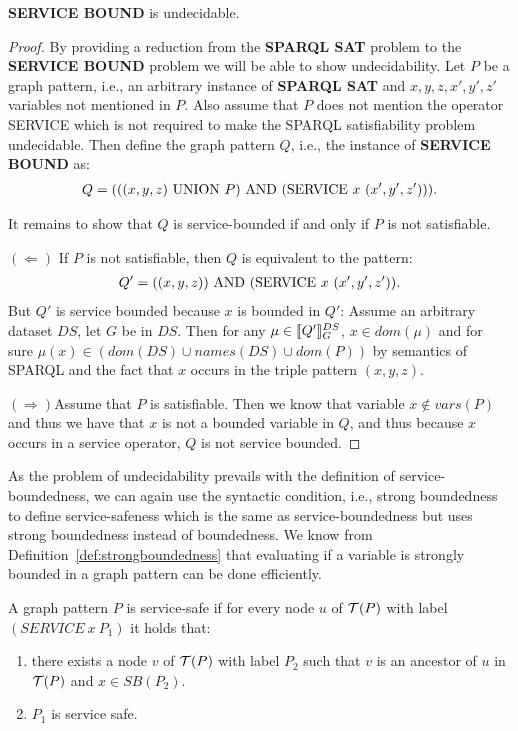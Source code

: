 \begin{theorem}
	\textbf{SERVICE BOUND} is undecidable.
\end{theorem}
\begin{proof}
	By providing a reduction from the \textbf{SPARQL SAT} problem to the  
	\textbf{SERVICE BOUND} problem we will be able to show undecidability.
	Let $P$ be a graph pattern, i.e., an arbitrary instance of \textbf{SPARQL SAT} and
	$x,y,z,x',y',z'$ variables not mentioned in $P$.
	Also assume that $P$ does not mention the operator SERVICE which is not required
	to make the SPARQL satisfiability problem undecidable.
	Then define the graph pattern $Q$, i.e., the instance of \textbf{SERVICE BOUND} as: 
	\begin{align*}
		Q = (((x,y,z) \mbox{ UNION }  P) \mbox{ AND } (\mbox{SERVICE } x \ (x', y', z'))).
	\end{align*}

	\noindent It remains to show that $Q$ is service-bounded if and only if $P$ is not
	satisfiable.

	\bigskip\noindent
	$(\Leftarrow)$ \quad If $P$ is not satisfiable, then $Q$ is equivalent to the
	pattern: 
	\begin{align*}
		Q' = ((x,y,z)) \mbox{ AND } (\mbox{SERVICE} \ x \ (x', y', z')).
	\end{align*} 
	But $Q'$ is service bounded because $x$ is bounded in $Q'$: Assume an
	arbitrary dataset $DS$, let $G$ be in $DS$. Then 
	for any $\mu \in \llbracket Q' \rrbracket^{DS}_G$, $x \in dom(\mu)$ and for sure $\mu(x) \in
	(dom(DS) \cup names(DS) \cup dom(P))$ by semantics of SPARQL and the fact that
	$x$ occurs in the triple pattern $(x,y,z)$.


	\bigskip\noindent
	$(\Rightarrow)$\quad Assume that $P$ is satisfiable. Then we know that variable
	$x \not\in vars(P)$ and thus we have that $x$ is not a bounded variable in $Q$,
	and thus because $x$ occurs in a service operator, $Q$ is not service
	bounded.
\end{proof}

As the problem of undecidability prevails with the definition of
service-boundedness, we can again use the syntactic condition, i.e., strong boundedness to define
service-safeness which is the same as service-boundedness but uses strong
boundedness instead of boundedness. We know from
Definition~\ref{def:strongboundedness} that evaluating if a variable is strongly
bounded in a graph pattern can be done efficiently.

\begin{definition}
	A graph pattern $P$ is service-safe if for every node $u$ of $\mathcal{T}(P)$ with
	label $(SERVICE \ x \ P_1)$ it holds that:
	\begin{enumerate}
		\item there exists a node $v$ of $\mathcal{T}(P)$ with label $P_2$ such that $v$
			is an ancestor of $u$ in $\mathcal{T}(P)$ and $x \in SB(P_2)$.
		\item $P_1$ is service safe.
	\end{enumerate}
\end{definition}

